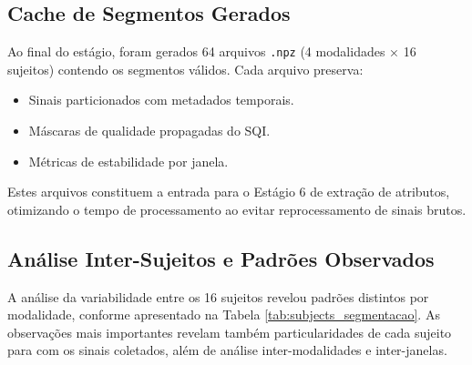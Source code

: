 \subsection{Cache de Segmentos Gerados}

Ao final do estágio, foram gerados 64 arquivos \texttt{.npz} (4 modalidades × 16 sujeitos) contendo os segmentos válidos. Cada arquivo preserva:
\begin{itemize}
    \item Sinais particionados com metadados temporais.
    \item Máscaras de qualidade propagadas do SQI.
    \item Métricas de estabilidade por janela.
\end{itemize}

Estes arquivos constituem a entrada para o Estágio 6 de extração de atributos, otimizando o tempo de processamento ao evitar reprocessamento de sinais brutos.

\subsection{Análise Inter-Sujeitos e Padrões Observados}

A análise da variabilidade entre os 16 sujeitos revelou padrões distintos por modalidade, conforme apresentado na Tabela \ref{tab:subjects_segmentacao}. As observações mais importantes revelam também particularidades de cada sujeito para com os sinais coletados, além de análise inter-modalidades e inter-janelas.

